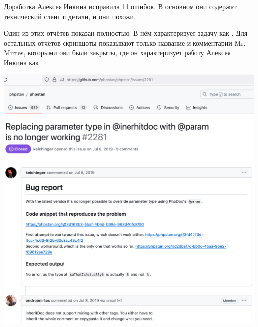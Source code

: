 
Доработка Алексея Инкина исправила 11 ошибок.
В основном они содержат технический сленг и детали, и они похожи.

Один из этих отчётов показан полностью. В нём \MrMirtesT характеризует задачу как .
Для остальных отчётов скриншоты показывают только название и комментарии
Mr. Mirtes, которыми они были закрыты, где он характеризует работу Алексея Инкина как .

\begin{center}
    \includegraphics[width=37em]{issue-2281-full-p1}
\end{center}
\WillContinue
\pagebreak

